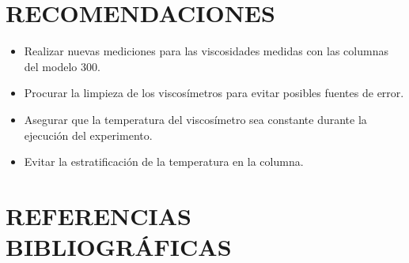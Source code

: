 \documentclass[12pt, letterpaper]{article}
\begin{document}
\section{RECOMENDACIONES}

\begin{itemize}
    \item Realizar nuevas mediciones para las viscosidades medidas con las columnas del modelo 300.
    \item Procurar la limpieza de los viscosímetros para evitar posibles fuentes de error.
    \item Asegurar que la temperatura del viscosímetro sea constante durante la ejecución del experimento.
    \item Evitar la estratificación de la temperatura en la columna.
\end{itemize}

\section{REFERENCIAS BIBLIOGRÁFICAS}

\printbibliography

\end{document}
